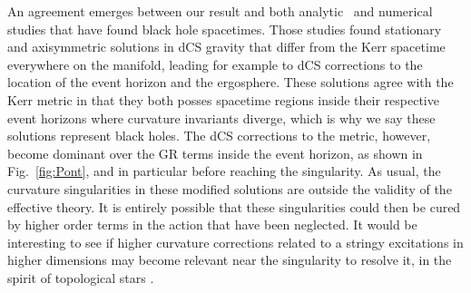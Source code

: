\documentclass[prd,twocolumn,showpacs,superscriptaddress,nofootinbib]{revtex4-2}
\newcommand{\stationary}{\mbox{\tiny sry}}
\newcommand{\generic}{\mbox{\tiny g}}
\begin{document}
%
%
%
%

An agreement emerges between our result and both analytic~\cite{Yunes:2009hc,Yagi:2012ya,Maselli:2017kic} and numerical~\cite{Delsate:2018ome,Sullivan:2020zpf} studies that have found black hole spacetimes. Those studies found stationary and axisymmetric solutions in dCS gravity that differ from the Kerr spacetime everywhere on the manifold, leading for example to dCS corrections to the location of the event horizon and the ergosphere. These solutions agree with the Kerr metric in that they both posses spacetime regions inside their respective event horizons where curvature invariants diverge, which is why we say these solutions represent black holes. The dCS corrections to the metric, however, become dominant over the GR terms inside the event horizon, as shown in Fig.~\ref{fig:Pont}, and in particular before reaching the singularity. As usual, the curvature singularities in these modified solutions are outside the validity of the effective theory. It is entirely possible that these singularities could then be cured by higher order terms in the action that have been neglected. It would be interesting to see if higher curvature corrections related to a stringy excitations in higher dimensions  may become relevant near the singularity to resolve it, in the spirit of topological stars \cite{Bah}.






\end{document}
